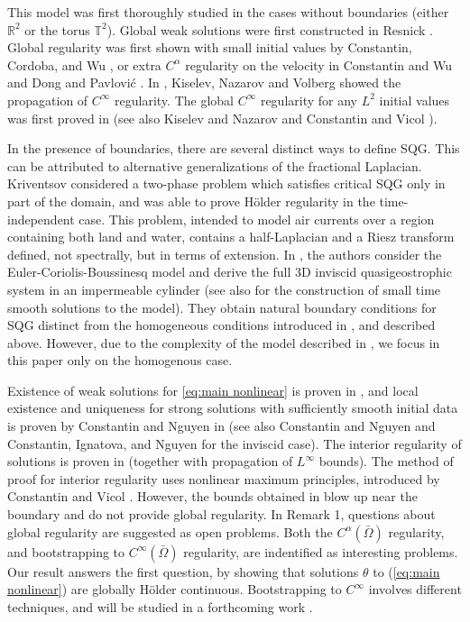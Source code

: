 \documentclass[11pt]{amsart}
\theoremstyle{remark}
\theoremstyle{definition}
\newcommand{\R}{\mathbb{R}}
\newcommand{\T}{\mathbb{T}}
\begin{document}
This model was first thoroughly studied in the cases without boundaries (either $\R^2$ or the torus $\T^2$).   
Global weak solutions were first constructed in Resnick \cite{Re}. Global regularity was first shown with small initial values by Constantin, Cordoba, and Wu \cite{CoCoWu}, or extra $C^\alpha$ regularity on the velocity in Constantin and Wu \cite{CoWu} and Dong and Pavlovi\'{c} \cite{DoPa}. In \cite{KiNaVo}, Kiselev, Nazarov and Volberg showed the 
propagation of $C^\infty$ regularity. The global $C^\infty$ regularity for any $L^2$ initial values was first proved in  \cite{CaVa.sqg} (see also Kiselev and Nazarov \cite{KiNa.variations} and Constantin and Vicol \cite{CoVi}).   

\vskip0.3cm

In the presence of boundaries, there are several  distinct ways to define SQG. This can be attributed  to alternative generalizations of the fractional Laplacian.  Kriventsov \cite{Kr} considered a two-phase problem which satisfies critical SQG only in part of the domain, and was able to prove H\"{o}lder regularity in the time-independent case.  This problem, intended to model air currents over a region containing both land and water, contains a half-Laplacian and a Riesz transform defined, not spectrally, but in terms of extension.  In \cite{NoVa.bounded}, the authors consider the Euler-Coriolis-Boussinesq model and derive the full 3D inviscid quasigeostrophic system in an impermeable cylinder (see also \cite{NoVa.solutions} for the construction of small time smooth solutions to the model).  They obtain natural boundary conditions for SQG distinct from the homogeneous conditions introduced in \cite{CoIg.fraclap}, \cite{CoIg.sqg} and described above. 
However, due to the complexity of the model described in \cite{NoVa.bounded}, we focus in this paper only on the homogenous case.

\vskip0.3cm
Existence of weak solutions for \eqref{eq:main nonlinear}  is proven in \cite{CoIg.fraclap}, and local existence and uniqueness for strong solutions with sufficiently smooth initial data is proven by Constantin and Nguyen in \cite{CoNg.strong} (see also Constantin and Nguyen \cite{CoNg} and Constantin, Ignatova, and Nguyen \cite{CoIgNg} for the inviscid case). The interior regularity of solutions  is proven in \cite{CoIg.sqg} (together with propagation of $L^\infty$ bounds).  The method of proof for interior regularity uses  nonlinear maximum principles, introduced by Constantin and Vicol \cite{CoVi}.   However, the bounds obtained in \cite{CoIg.sqg} blow up near the boundary and do not provide global regularity.
  In \cite{CoIg.sqg} Remark 1, questions about   global regularity are suggested as  open problems.  Both the $C^\alpha(\bar{\Omega})$ regularity,  and bootstrapping to  $C^\infty(\bar{\Omega})$ regularity, are indentified as interesting problems.  
  Our  result answers the first question, by  showing  that solutions $\theta$ to (\ref{eq:main nonlinear}) are globally H\"{o}lder continuous.
  Bootstrapping to $C^\infty$ involves different techniques, and will be studied in a forthcoming work \cite{StVa.higher}.  
\vskip0.3cm
\end{document}
